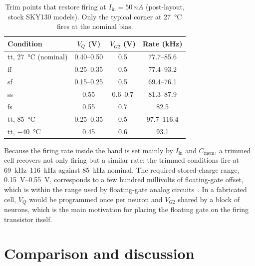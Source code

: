 \documentclass[a4paper,fleqn]{cas-dc}
\begin{document}
\begin{table}[t]
\centering
\caption{Trim points that restore firing at $I_{\mathrm{in}} = \SI{50}{nA}$ (post-layout, stock SKY130 models). Only the typical corner at \SI{27}{\celsius} fires at the nominal bias.}
\label{tab:trim}
\begin{tabular}{@{}lccc@{}}
\toprule
Condition & $V_Q$ (V) & $V_{G2}$ (V) & Rate (kHz) \\
\midrule
tt, \SI{27}{\celsius} (nominal) & 0.40--0.50 & 0.5 & 77.7--85.6 \\
ff & 0.25--0.35 & 0.5 & 77.4--93.2 \\
sf & 0.15--0.25 & 0.5 & 69.4--76.1 \\
ss & 0.55 & 0.6--0.7 & 81.3--87.9 \\
fs & 0.55 & 0.7 & 82.5 \\
tt, \SI{85}{\celsius} & 0.25--0.35 & 0.5 & 97.7--116.4 \\
tt, \SI{-40}{\celsius} & 0.45 & 0.6 & 93.1 \\
\bottomrule
\end{tabular}
\end{table}

Because the firing rate inside the band is set mainly by $I_{\mathrm{in}}$ and $C_{\mathrm{mem}}$, a trimmed cell recovers not only firing but a similar rate: the trimmed conditions fire at \SIrange{69}{116}{kHz} against \SI{85}{kHz} nominal. The required stored-charge range, \SIrange{0.15}{0.55}{V}, corresponds to a few hundred millivolts of floating-gate offset, which is within the range used by floating-gate analog circuits~\cite{diorio1996,hasler2021woset}. In a fabricated cell, $V_Q$ would be programmed once per neuron and $V_{G2}$ shared by a block of neurons, which is the main motivation for placing the floating gate on the firing transistor itself.

\section{Comparison and discussion}
\label{sec:discussion}
\end{document}
